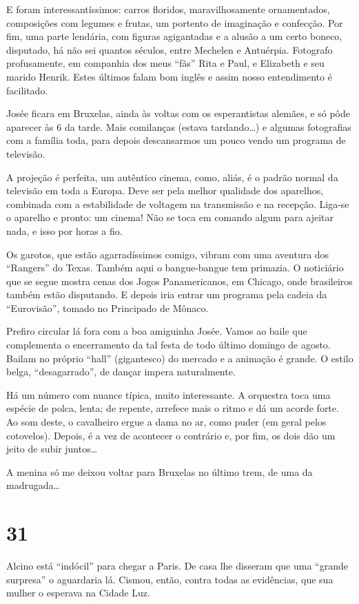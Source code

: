 E foram interessantíssimos: carros floridos, maravilhosamente ornamentados, composições com legumes e frutas, um portento de imaginação e confecção. Por fim, uma parte lendária, com figuras agigantadas e a alusão a um certo boneco, disputado, há não sei quantos séculos, entre Mechelen e Antuérpia. Fotografo profusamente, em companhia dos meus ``fãs'' Rita e Paul, e Elizabeth e seu marido Henrik. Estes últimos falam bom inglês e assim nosso entendimento é facilitado.

Josée ficara em Bruxelas, ainda às voltas com os esperantistas alemães, e só pôde aparecer às 6 da tarde. Mais comilanças (estava tardando\ldots) e algumas fotografias com a família toda, para depois descansarmos um pouco vendo um programa de televisão.

A projeção é perfeita, um autêntico cinema, como, aliás, é o padrão normal da televisão em toda a Europa. Deve ser pela melhor qualidade dos aparelhos, combinada com a estabilidade de voltagem na transmissão e na recepção. Liga-se o aparelho e pronto: um cinema! Não se toca em comando algum para ajeitar nada, e isso por horas a fio.

Os garotos, que estão agarradíssimos comigo, vibram com uma aventura dos ``Rangers'' do Texas. Também aqui o bangue-bangue tem primazia. O noticiário que se segue mostra cenas dos Jogos Panamericanos, em Chicago, onde brasileiros também estão disputando. E depois iria entrar um programa pela cadeia da ``Eurovisão'', tomado no Principado de Mônaco.

Prefiro circular lá fora com a boa amiguinha Josée. Vamos ao baile que complementa o encerramento da tal festa de todo último domingo de agosto. Bailam no próprio ``hall'' (gigantesco) do mercado e a animação é grande. O estilo belga, ``desagarrado'', de dançar impera naturalmente.

Há um número com nuance típica, muito interessante. A orquestra toca uma espécie de polca, lenta; de repente, arrefece mais o ritmo e dá um acorde forte. Ao som deste, o cavalheiro ergue a dama no ar, como puder (em geral pelos cotovelos). Depois, é a vez de acontecer o contrário e, por fim, os dois dão um jeito de subir juntos\ldots

A menina só me deixou voltar para Bruxelas no último trem, de uma da madrugada\ldots

\section*{31 \adfflatleafright {}}
Alcino está ``indócil'' para chegar a Paris. De casa lhe disseram que uma ``grande surpresa'' o aguardaria lá. Cismou, então, contra todas as evidências, que sua mulher o esperava na Cidade Luz.


